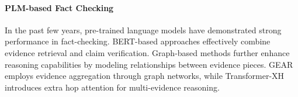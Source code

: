 \paragraph{PLM-based Fact Checking} In the past few years, pre-trained language models have demonstrated strong performance in fact-checking. BERT-based approaches \cite{soleimani2020bert, gi2021verdict} effectively combine evidence retrieval and claim verification. Graph-based methods further enhance reasoning capabilities by modeling relationships between evidence pieces. GEAR \cite{zhou2019gear} employs evidence aggregation through graph networks, while Transformer-XH \cite{zhao2020transformer} introduces extra hop attention for multi-evidence reasoning. 


